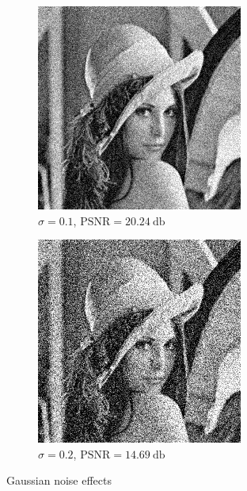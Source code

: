 \documentclass[12pt,english]{article}
\begin{document}
\begin{figure}
	\begin{subfigure}[t]{0.4\textwidth}
		\centering
		\includegraphics[width=.9\textwidth]{img/lenan2}
		\caption{$\sigma = 0.1$, $\text{PSNR}=\SI{20.24}{\decibel}$}
		\label{fig:lenag2}
	\end{subfigure}%
	\qquad
	\begin{subfigure}[t]{0.4\textwidth}
		\centering
		\includegraphics[width=.9\textwidth]{img/lenan3}
		\caption{$\sigma = 0.2$, $\text{PSNR}=\SI{14.69}{\decibel}$}
		\label{fig:lenag3}
	\end{subfigure}
	\caption{Gaussian noise effects}
	\label{fig:lenag}
\end{figure}
\end{document}

